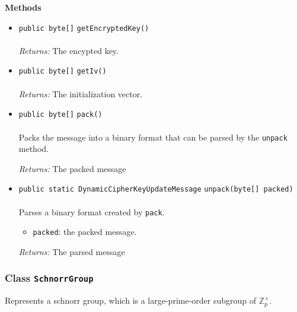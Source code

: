 \textbf{\sffamily Methods}
\begin{itemize}
\item \lstinline|public byte[]| \lstinline|getEncryptedKey|\lstinline|()|\\ \\[-0.6em]
\emph{Returns:} The encypted key.



\item \lstinline|public byte[]| \lstinline|getIv|\lstinline|()|\\ \\[-0.6em]
\emph{Returns:} The initialization vector.



\item \lstinline|public byte[]| \lstinline|pack|\lstinline|()|\\ \\[-0.6em]
Packs the message into a binary format that can be parsed
 by the \lstinline|unpack| method.

\emph{Returns:} The packed message

\item \lstinline|public static DynamicCipherKeyUpdateMessage| \lstinline|unpack|\lstinline|(byte[] packed)|\\ \\[-0.6em]
Parses a binary format created by \lstinline|pack|.
\begin{itemize}
\item \lstinline|packed|: the packed message.
\end{itemize}

\emph{Returns:} The parsed message

\end{itemize}

\subsubsection{Class \lstinline|SchnorrGroup|}
Represents a schnorr group, which is a large-prime-order subgroup of
 $\mathbb{Z}_p^\times$. \\
\noindent\begin{minipage}[t]{5cm}
\vspace{0.3em}
\hspace*{2em}
\vspace{0.3em}
\end{minipage}



